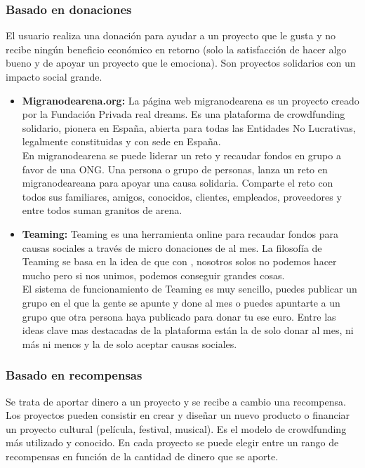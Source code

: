 \subsubsection{Basado en donaciones}
El usuario realiza una donación para ayudar a un proyecto que le gusta y no recibe ningún beneficio económico en retorno (solo la satisfacción de hacer algo bueno y de apoyar un proyecto que le emociona). Son proyectos solidarios con un impacto social grande.
\begin{itemize}
	\item \textbf{Migranodearena.org:}\smallbreak
	La página web migranodearena es un proyecto creado por la Fundación Privada real dreams. Es una plataforma de crowdfunding solidario, pionera en España, abierta para todas las Entidades No Lucrativas, legalmente constituidas y con sede en España. \\
	En migranodearena se puede liderar un reto y recaudar fondos en grupo a favor de una ONG. Una persona o grupo de personas, lanza un reto en migranodeareana para apoyar una causa solidaria. Comparte el reto con todos sus familiares, amigos, conocidos, clientes, empleados, proveedores y entre todos suman granitos de arena.
	\item \textbf{Teaming:}\smallbreak
	Teaming es una herramienta online para recaudar fondos para causas sociales a través de micro donaciones de  al mes. La filosofía de Teaming se basa en la idea de que con , nosotros solos no podemos hacer mucho pero si nos unimos, podemos conseguir grandes cosas.\\
	El sistema de funcionamiento de Teaming es muy sencillo, puedes publicar un grupo en el que la gente se apunte y done  al mes o puedes apuntarte a un grupo que otra persona haya publicado para donar tu ese euro. Entre las ideas clave mas destacadas de la plataforma están la de solo donar  al mes, ni más ni menos y la de solo aceptar causas sociales.
\end{itemize}

\subsubsection{Basado en recompensas}
Se trata de aportar dinero a un proyecto y se recibe a cambio una recompensa. Los proyectos pueden consistir en crear y diseñar un nuevo producto o financiar un proyecto cultural (película, festival, musical). Es el modelo de crowdfunding más utilizado y conocido. En cada proyecto se puede elegir entre un rango de recompensas en función de la cantidad de dinero que se aporte.

